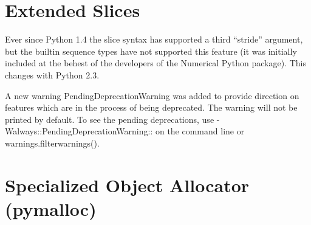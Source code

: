 \documentclass{howto}
\begin{document}
\begin{seealso}


\end{seealso}

\section{Extended Slices\label{extended-slices}}

Ever since Python 1.4 the slice syntax has supported a third
``stride'' argument, but the builtin sequence types have not supported
this feature (it was initially included at the behest of the
developers of the Numerical Python package).  This changes with Python
2.3.








A new warning PendingDeprecationWarning was added to provide
direction on features which are in the process of being deprecated.
The warning will not be printed by default.  To see the pending
deprecations, use -Walways::PendingDeprecationWarning:: on the command line
or warnings.filterwarnings().


\section{Specialized Object Allocator (pymalloc)\label{section-pymalloc}}
\end{document}

